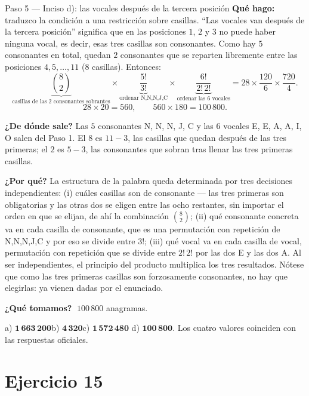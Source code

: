 \documentclass[11pt]{article}
\begin{document}
\begin{paso}{Paso 5 --- Inciso d): las vocales después de la tercera posición}
\textbf{Qué hago:} traduzco la condición a una restricción sobre casillas. ``Las vocales van después de la
tercera posición'' significa que en las posiciones $1$, $2$ y $3$ no puede haber ninguna vocal, es decir,
esas tres casillas son consonantes. Como hay $5$ consonantes en total, quedan $2$ consonantes que se
reparten libremente entre las posiciones $4,5,\dots,11$ ($8$ casillas). Entonces:
\[
\underbrace{\binom{8}{2}}_{\text{casillas de las 2 consonantes sobrantes}}\times
\underbrace{\frac{5!}{3!}}_{\text{ordenar N,N,N,J,C}}\times
\underbrace{\frac{6!}{2!\,2!}}_{\text{ordenar las 6 vocales}}
=28\times\frac{120}{6}\times\frac{720}{4} .
\]
\[
28\times 20=560,\qquad 560\times 180=100\,800 .
\]

\textbf{¿De dónde sale?} Las $5$ consonantes N, N, N, J, C y las $6$ vocales E, E, A, A, I, O salen del
Paso 1. El $8$ es $11-3$, las casillas que quedan después de las tres primeras; el $2$ es $5-3$, las
consonantes que sobran tras llenar las tres primeras casillas.

\textbf{¿Por qué?} La estructura de la palabra queda determinada por tres decisiones independientes: (i)
cuáles casillas son de consonante --- las tres primeras son obligatorias y las otras dos se eligen entre
las ocho restantes, sin importar el orden en que se elijan, de ahí la combinación $\binom{8}{2}$; (ii) qué
consonante concreta va en cada casilla de consonante, que es una permutación con repetición de N,N,N,J,C
y por eso se divide entre $3!$; (iii) qué vocal va en cada casilla de vocal, permutación con repetición
que se divide entre $2!\,2!$ por las dos E y las dos A. Al ser independientes, el principio del producto
multiplica los tres resultados. Nótese que como las tres primeras casillas son forzosamente consonantes,
no hay que elegirlas: ya vienen dadas por el enunciado.

\textbf{¿Qué tomamos?} $\;100\,800$ anagramas.
\end{paso}

\begin{resp}
a) $\mathbf{1\,663\,200}$\quad b) $\mathbf{4\,320}$\quad c) $\mathbf{1\,572\,480}$\quad
d) $\mathbf{100\,800}$. Los cuatro valores coinciden con las respuestas oficiales.
\end{resp}

\section*{Ejercicio 15}
\end{document}
